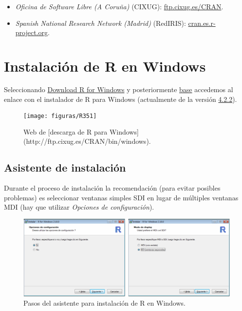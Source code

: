 \documentclass[
]{book}
\providecommand{\tightlist}{%
  \setlength{\itemsep}{0pt}\setlength{\parskip}{0pt}}
\theoremstyle{break}
\theoremstyle{nonumberplain}
\begin{document}
\begin{itemize}
\tightlist
\item
  \emph{Oficina de Software Libre (A Coruña)} (CIXUG): \href{http://ftp.cixug.es/CRAN/}{ftp.cixug.es/CRAN}.
\item
  \emph{Spanish National Research Network (Madrid)} (RedIRIS): \href{http://cran.es.r-project.org/}{cran.es.r-project.org}.
\end{itemize}

\hypertarget{windows}{%
\section{Instalación de R en Windows}\label{windows}}

Seleccionando \href{http://ftp.cixug.es/CRAN/bin/windows/}{Download R for Windows} y posteriormente \href{http://ftp.cixug.es/CRAN/bin/windows/base/}{base} accedemos al enlace con el instalador de R para Windows (actualmente de la versión \href{http://ftp.cixug.es/CRAN/bin/windows/base/R-4.2.2-win.exe}{4.2.2}).

\begin{figure}[!htb]

{\centering \texttt{[image: figuras/R351]} 

}

\caption{Web de [descarga de R para Windows](http://ftp.cixug.es/CRAN/bin/windows).}\label{fig:rdownload}
\end{figure}

\hypertarget{asistente-de-instalaciuxf3n}{%
\subsection{Asistente de instalación}\label{asistente-de-instalaciuxf3n}}

Durante el proceso de instalación la recomendación (para evitar posibles problemas) es seleccionar ventanas simples SDI en lugar de múltiples ventanas MDI (hay que utilizar \emph{Opciones de configuración}).

\begin{figure}[!htb]

{\centering \includegraphics[width=0.9\linewidth]{figuras/asistente} 

}

\caption{Pasos del asistente para instalación de R en Windows.}\label{fig:asistente}
\end{figure}
\end{document}
